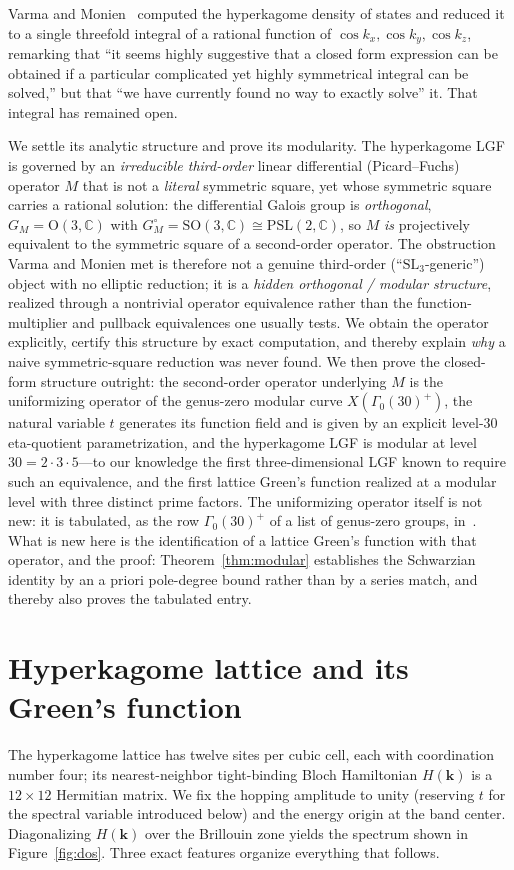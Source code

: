 \documentclass[cntp]{ipart}
\theoremstyle{plain}
\theoremstyle{remark}
\begin{document}
Varma and Monien~\cite{VarmaMonien2013} computed the hyperkagome density of states and reduced it to a single
threefold integral of a rational function of $\cos k_x,\cos k_y,\cos k_z$, remarking that ``it seems highly
suggestive that a closed form expression can be obtained if a particular complicated yet highly symmetrical
integral can be solved,'' but that ``we have currently found no way to exactly solve'' it. That integral has
remained open.

We settle its analytic structure and prove its modularity. The hyperkagome LGF is governed by an \emph{irreducible third-order}
linear differential (Picard--Fuchs) operator $M$ that is not a \emph{literal} symmetric square, yet whose symmetric square carries a
rational solution: the differential Galois group is \emph{orthogonal}, $G_M=\mathrm{O}(3,\mathbb{C})$ with
$G_M^\circ=\mathrm{SO}(3,\mathbb{C})\cong\mathrm{PSL}(2,\mathbb{C})$, so $M$ \emph{is} projectively equivalent to the
symmetric square of a second-order operator. The obstruction Varma and Monien met is therefore not a genuine
third-order (``$\mathrm{SL}_3$-generic'') object with no elliptic reduction; it is a \emph{hidden orthogonal /
modular structure}, realized through a nontrivial operator equivalence rather than the function-multiplier and
pullback equivalences one usually tests. We obtain the operator explicitly, certify this structure by exact
computation, and thereby explain \emph{why} a naive symmetric-square reduction was never found. We then prove the
closed-form structure outright: the second-order operator underlying $M$ is the uniformizing operator of the
genus-zero modular curve $X(\Gamma_0(30)^+)$, the natural variable $t$ generates its function field and is given
by an explicit level-30 eta-quotient parametrization, and the hyperkagome LGF is modular at level
$30=2\cdot3\cdot5$---to our knowledge the first
three-dimensional LGF known to require such an equivalence, and the first lattice Green's function realized at a
modular level with three distinct prime factors. The uniformizing operator itself is not new: it is tabulated,
as the row $\Gamma_0(30)^+$ of a list of genus-zero groups, in~\cite{LianYau1995}. What is new here is the
identification of a lattice Green's function with that operator, and the proof: Theorem~\ref{thm:modular}
establishes the Schwarzian identity by an a priori pole-degree bound rather than by a series match, and thereby
also proves the tabulated entry.

\section{Hyperkagome lattice and its Green's function}
\label{sec:lattice}
The hyperkagome lattice has twelve sites per cubic cell, each with coordination number four; its nearest-neighbor
tight-binding Bloch Hamiltonian $H(\bm k)$ is a $12\times12$ Hermitian matrix. We fix the hopping amplitude to
unity (reserving $t$ for the spectral variable introduced below) and the energy origin at the band center.
Diagonalizing $H(\bm k)$ over the Brillouin zone yields the spectrum shown in
Figure~\ref{fig:dos}. Three exact features organize everything that follows.
\end{document}
